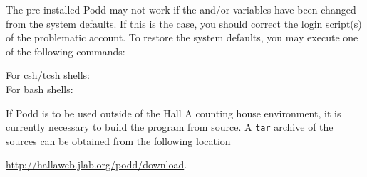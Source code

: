 {{The pre-installed Podd may not work if 
the  and/or  variables have been
changed from the system defaults. If this is the case, you should
correct the login script(s) of the problematic account.
To restore the system defaults, you may execute one of the following 
commands:

\begin{tabbing}
For csh/tcsh shells:$\qquad$ \= \\
For bash shells:     \> 
\end{tabbing}

If Podd is to be used outside of the Hall A counting house
environment, it is currently necessary to build the program from source.
A {\tt tar} archive of the sources can be obtained from the following
location
\begin{center}
  \url{http://hallaweb.jlab.org/podd/download}.
\end{center}

}}
